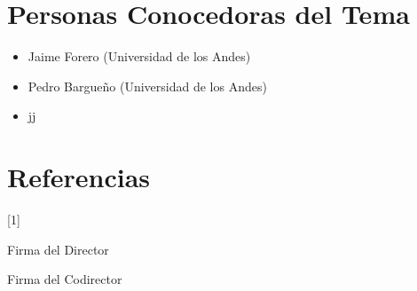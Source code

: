 \documentclass{article}
\begin{document}
\section{Personas Conocedoras del Tema}

\begin{itemize}

\item Jaime Forero (Universidad de los Andes)
\item Pedro Bargueño (Universidad de los Andes)
\item jj

\end{itemize}


\section{Referencias}

[1] 


Firma del Director


Firma del Codirector
\end{document}
